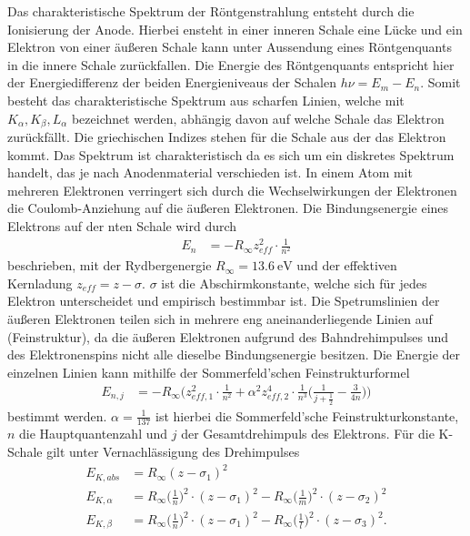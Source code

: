 Das charakteristische Spektrum der Röntgenstrahlung entsteht durch die Ionisierung der Anode.
Hierbei ensteht in einer inneren Schale eine Lücke und ein Elektron von einer äußeren Schale kann unter Aussendung eines Röntgenquants
in die innere Schale zurückfallen. Die Energie des Röntgenquants entspricht hier der Energiedifferenz der beiden Energieniveaus der Schalen
$h \nu = E_m-E_n$. Somit besteht das charakteristische Spektrum aus scharfen Linien, welche mit $K_\alpha, K_\beta, L_\alpha$ bezeichnet werden,
abhängig davon auf welche Schale das Elektron zurückfällt. Die griechischen Indizes stehen für die Schale aus der das Elektron kommt.
Das Spektrum ist charakteristisch da es sich um ein diskretes Spektrum handelt, das je nach Anodenmaterial verschieden ist.
In einem Atom mit mehreren Elektronen verringert sich durch die Wechselwirkungen der Elektronen die Coulomb-Anziehung auf die äußeren
Elektronen. Die Bindungsenergie eines Elektrons auf der nten Schale wird durch 
\begin{align}
    E_n &= -R_\infty z_{eff}^2 \cdot \frac{1}{n^2} \label{eqn:Bindungsenergie}
\end{align}
beschrieben, mit der Rydbergenergie $R_\infty = \qty{13.6}{\electronvolt}$ und der effektiven Kernladung $z_{eff} = z - \sigma$.
$\sigma$ ist die Abschirmkonstante, welche sich für jedes Elektron unterscheidet und empirisch bestimmbar ist.
Die Spetrumslinien der äußeren Elektronen teilen sich in mehrere eng aneinanderliegende Linien auf (Feinstruktur), da die äußeren
Elektronen aufgrund des Bahndrehimpulses und des Elektronenspins nicht alle dieselbe Bindungsenergie besitzen.
Die Energie der einzelnen Linien kann mithilfe der Sommerfeld'schen Feinstrukturformel
\begin{align}
    E_{n,j} &= -R_\infty \bigl(z_{eff,1}^2 \cdot \frac{1}{n^2} + \alpha^2 z_{eff,2}^4 \cdot \frac{1}{n^3} \bigl(\frac{1}{j+\frac{1}{2}} - \frac{3}{4n}\bigr)\bigr)
    \label{eqn:Sommerfeld}
\end{align}
bestimmt werden.
$\alpha = \frac{1}{137}$ ist hierbei die Sommerfeld'sche Feinstrukturkonstante, $n$ die Hauptquantenzahl und $j$ der Gesamtdrehimpuls des Elektrons.
Für die K-Schale gilt unter Vernachlässigung des Drehimpulses
\begin{align}
    E_{K,abs} &= R_\infty (z-\sigma_1)^2 \label{eqn:Ekabs}\\
    E_{K,\alpha} &= R_\infty \bigl(\frac{1}{n}\bigr)^2 \cdot (z-\sigma_1)^2 - R_\infty \bigl(\frac{1}{m}\bigr)^2 \cdot (z-\sigma_2)^2 \label{eqn:Eka}\\
    E_{K,\beta} &= R_\infty \bigl(\frac{1}{n}\bigr)^2 \cdot (z-\sigma_1)^2 - R_\infty \bigl(\frac{1}{l}\bigr)^2 \cdot (z-\sigma_3)^2. \label{eqn:Ekb}
\end{align}

